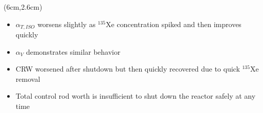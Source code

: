 \begin{frame}
\begin{textblock*}{12.5cm}
\begin{columns}
		\column[t]{6cm}
		\begin{textblock*}{6.7cm}(6cm,2.6cm) %
			\begin{itemize}
				\itemsep=0.8em
				\item<1-> $\alpha_{T,ISO}$ worsens slightly as $^{135}$Xe 
				concentration spiked and then improves quickly
				\item<2-> $\alpha_V$ demonstrates similar behavior
				\item<3-> CRW worsened after shutdown but then quickly 
				recovered due to quick $^{135}$Xe removal
				\item<4-> Total control rod worth is insufficient to shut down 
				the reactor safely at any time
			\end{itemize}
			
		\end{textblock*}
	\end{columns}
\end{textblock*}
\end{frame}
